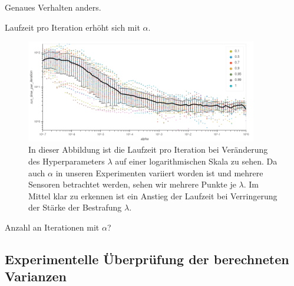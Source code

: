Genaues Verhalten anders.

Laufzeit pro Iteration erhöht sich mit $\alpha$.
\begin{figure}
\centering
\includegraphics[width = 0.9\textwidth]{figures/run_time_per_iteration.png}
\caption{In dieser Abbildung ist die Laufzeit pro Iteration bei Veränderung des Hyperparameters $\lambda$ auf einer logarithmischen Skala zu sehen. Da auch $\alpha$ in unseren Experimenten variiert worden ist und mehrere Sensoren betrachtet werden, sehen wir mehrere Punkte je $\lambda$. Im Mittel klar zu erkennen ist ein Anstieg der Laufzeit bei Verringerung der Stärke der Bestrafung $\lambda$.}
\label{run_time_per_iteration}
\end{figure}



Anzahl an Iterationen mit $\alpha$?




\subsection{Experimentelle Überprüfung der berechneten Varianzen}

